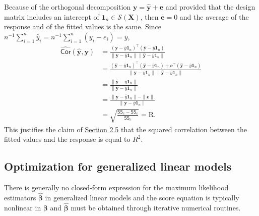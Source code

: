 \documentclass[
  11pt,
  letterpaper,
]{book}
\theoremstyle{definition}
\theoremstyle{definition}
\theoremstyle{definition}
\theoremstyle{definition}
\theoremstyle{remark}
\begin{document}
Because of the orthogonal decomposition \(\boldsymbol{y}=\widehat{\boldsymbol{y}} + \boldsymbol{e}\) and provided that the design matrix includes an intercept of \(\mathbf{1}_n \in \mathcal{S}(\mathbf{X})\), then \(\overline{\boldsymbol{e}}=0\) and the average of the response and of the fitted values is the same. Since \(n^{-1}\sum_{i=1}^n \widehat{y}_i = n^{-1}\sum_{i=1}^n ({y}_i-e_i)=\overline{y}\),
\begin{align*}
\widehat{\mathsf{Cor}}\left(\widehat{\boldsymbol{y}}, \boldsymbol{y}\right)
&= \frac{(\boldsymbol{y} - \overline{y}\mathbf{1}_n)^\top(\widehat{\boldsymbol{y}} - \overline{y}\mathbf{1}_n)}
{\|\boldsymbol{y} - \overline{y}\mathbf{1}_n\|\|\widehat{\boldsymbol{y}} - \overline{y}\mathbf{1}_n\|}
\\&= \frac{(\widehat{\boldsymbol{y}} - \overline{y}\mathbf{1}_n)^\top(\widehat{\boldsymbol{y}} - \overline{y}\mathbf{1}_n) +
\boldsymbol{e}^\top(\widehat{\boldsymbol{y}} - \overline{y}\mathbf{1}_n)}
{\|\boldsymbol{y} - \overline{y}\mathbf{1}_n\|\|\widehat{\boldsymbol{y}} - \overline{y}\mathbf{1}_n\|}
\\&= \frac{\|\widehat{\boldsymbol{y}} - \overline{y}\mathbf{1}_n\|}
{\|\boldsymbol{y} - \overline{y}\mathbf{1}_n\|}
\\&= \frac{\|\boldsymbol{y} - \overline{y}\mathbf{1}_n\| - \|\boldsymbol{e}\|}
{\|\boldsymbol{y} - \overline{y}\mathbf{1}_n\|}
\\&= \sqrt{\frac{\mathsf{SS}_c-\mathsf{SS}_e}{\mathsf{SS}_c}}= \mathrm{R}.
\end{align*}
This justifies the claim of \protect\hyperlink{coefR2}{Section 2.5} that the squared correlation between the fitted values and the response is equal to \(R^2\).

\hypertarget{optimization-for-generalized-linear-models}{%
\subsection{Optimization for generalized linear models}\label{optimization-for-generalized-linear-models}}

There is generally no closed-form expression for the maximum likelihood
estimators \(\widehat{\boldsymbol{\beta}}\) in generalized linear models
and the score equation is typically nonlinear in \(\boldsymbol{\beta}\)
and \(\widehat{\boldsymbol{\beta}}\) must be obtained through iterative
numerical routines.
\end{document}
